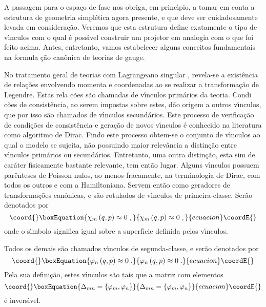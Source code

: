 \documentclass[a4paper,thmsa,12pt]{report}
\begin{document}
A passagem para o espa\c{c}o de fase nos obriga, em princ\'{\i}pio, a tomar
em conta a estrutura de geometria simpl\'{e}tica agora presente, e que deve
ser cuidadosamente levada em consi\-de\-ra\c{c}\~{a}o. Veremos que esta
estrutura define exatamente o tipo de v\'{\i}nculos com o qual \'{e}
poss\'{\i}vel construir um projetor em analogia com o que foi feito acima.
Antes, entretanto, vamos estabelecer alguns conceitos fundamentais na formula%
\c{c}\~{a}o can\^{o}nica de teorias de gauge.

No tratamento geral de teorias com Lagrangeano singular \cite{dirac},
revela-se a exist\^{e}ncia de rela\c{c}\~{o}es envolvendo momenta e
coordenadas ao se realizar a transforma\c{c}\~{a}o de Legendre. Estas rela\c{%
c}\~{o}es s\~{a}o chamadas de v\'{\i}nculos prim\'{a}rios da teoria. Condi\c{%
c}\~{o}es de consist\^{e}ncia, ao serem impostas sobre estes, d\~{a}o origem
a outros v\'{\i}nculos, que por isso s\~{a}o chamados de v\'{\i}nculos
secund\'{a}rios. Este processo de verifica\c{c}\~{a}o de condi\c{c}\~{o}es
de consist\^{e}ncia e gera\c{c}\~{a}o de novos v\'{\i}nculos \'{e} conhecido
na literatura como algoritmo de Dirac. Findo este processo obtem-se o
conjunto de v\'{\i}nculos ao qual o modelo se sujeita, n\~{a}o possuindo
maior relev\^{a}ncia a distin\c{c}\~{a}o entre v\'{\i}nculos prim\'{a}rios
ou secund\'{a}rios. Entretanto, uma outra distin\c{c}\~{a}o, esta sim de
car\'{a}ter fisicamente bastante relevante, tem ent\~{a}o lugar. Alguns
v\'{\i}nculos possuem par\^{e}nteses de Poisson nulos, ao menos fracamente,
na terminologia de Dirac, com todos os outros e com a Hamiltoniana. Servem
ent\~{a}o como geradores de transforma\c{c}\~{o}es can\^{o}nicas, e s\~{a}o
rotulados de v\'{\i}nculos de primeira-classe. Ser\~{a}o denotados por 
\begin{equation}\coord{}\boxEquation{
\chi _{m}\left( q,p\right) \approx 0  \;, \label{15}
}{
\chi _{m}\left( q,p\right) \approx 0  \;, }{ecuacion}\coordE{}\end{equation}
onde o s\'{\i}mbolo \myHighlight{$\approx $}\coordHE{} significa igual sobre a superf\'{\i}cie
definida pelos v\'{\i}nculos.

Todos os demais s\~{a}o chamados v\'{\i}nculos de segunda-classe, e
ser\~{a}o denotados por 
\begin{equation}\coord{}\boxEquation{
\varphi _{n}\left( q,p\right) \approx 0  \;. \label{16}
}{
\varphi _{n}\left( q,p\right) \approx 0  \;. }{ecuacion}\coordE{}\end{equation}
Pela sua defini\c{c}\~{a}o, estes v\'{\i}nculos s\~{a}o tais que a matriz
com elementos 
\begin{equation}\coord{}\boxEquation{
\Delta _{mn}=\{\varphi _{m},\varphi _{n}\}  \label{17}
}{
\Delta _{mn}=\{\varphi _{m},\varphi _{n}\}  }{ecuacion}\coordE{}\end{equation}
\'{e} invers\'{\i}vel.
\end{document}
